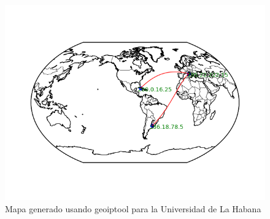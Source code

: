 \begin{figure}
	\centering
 	\includegraphics[scale=0.8]{imagenes/mapa_cuba_1.png}
 	\caption{Mapa generado usando geoiptool para la Universidad de La Habana}
\end{figure} 
